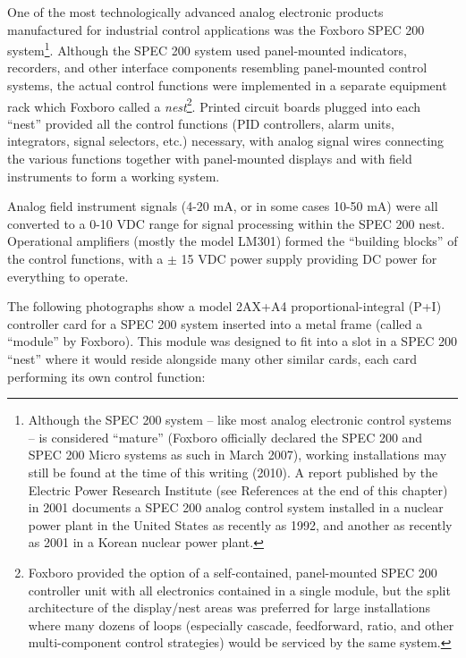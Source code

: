 One of the most technologically advanced analog electronic products manufactured for industrial control applications was the Foxboro SPEC 200 system\footnote{Although the SPEC 200 system -- like most analog electronic control systems -- is considered ``mature'' (Foxboro officially declared the SPEC 200 and SPEC 200 Micro systems as such in March 2007), working installations may still be found at the time of this writing (2010).  A report published by the Electric Power Research Institute (see References at the end of this chapter) in 2001 documents a SPEC 200 analog control system installed in a nuclear power plant in the United States as recently as 1992, and another as recently as 2001 in a Korean nuclear power plant.}.  Although the SPEC 200 system used panel-mounted indicators, recorders, and other interface components resembling panel-mounted control systems, the actual control functions were implemented in a separate equipment rack which Foxboro called a \textit{nest}\footnote{Foxboro provided the option of a self-contained, panel-mounted SPEC 200 controller unit with all electronics contained in a single module, but the split architecture of the display/nest areas was preferred for large installations where many dozens of loops (especially cascade, feedforward, ratio, and other multi-component control strategies) would be serviced by the same system.}.  Printed circuit boards plugged into each ``nest'' provided all the control functions (PID controllers, alarm units, integrators, signal selectors, etc.) necessary, with analog signal wires connecting the various functions together with panel-mounted displays and with field instruments to form a working system.    

Analog field instrument signals (4-20 mA, or in some cases 10-50 mA) were all converted to a 0-10 VDC range for signal processing within the SPEC 200 nest.  Operational amplifiers (mostly the model LM301) formed the ``building blocks'' of the control functions, with a $\pm$ 15 VDC power supply providing DC power for everything to operate.

\filbreak

The following photographs show a model 2AX+A4 proportional-integral (P+I) controller card for a SPEC 200 system inserted into a metal frame (called a ``module'' by Foxboro).  This module was designed to fit into a slot in a SPEC 200 ``nest'' where it would reside alongside many other similar cards, each card performing its own control function:

